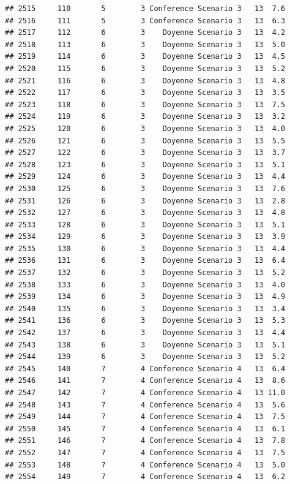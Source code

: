 \documentclass[
]{article}
\begin{document}
\begin{verbatim}
## 2515     110       5        3 Conference Scenario 3   13  7.6
## 2516     111       5        3 Conference Scenario 3   13  6.3
## 2517     112       6        3    Doyenne Scenario 3   13  4.2
## 2518     113       6        3    Doyenne Scenario 3   13  5.0
## 2519     114       6        3    Doyenne Scenario 3   13  4.5
## 2520     115       6        3    Doyenne Scenario 3   13  5.2
## 2521     116       6        3    Doyenne Scenario 3   13  4.8
## 2522     117       6        3    Doyenne Scenario 3   13  3.5
## 2523     118       6        3    Doyenne Scenario 3   13  7.5
## 2524     119       6        3    Doyenne Scenario 3   13  3.2
## 2525     120       6        3    Doyenne Scenario 3   13  4.0
## 2526     121       6        3    Doyenne Scenario 3   13  5.5
## 2527     122       6        3    Doyenne Scenario 3   13  3.7
## 2528     123       6        3    Doyenne Scenario 3   13  5.1
## 2529     124       6        3    Doyenne Scenario 3   13  4.4
## 2530     125       6        3    Doyenne Scenario 3   13  7.6
## 2531     126       6        3    Doyenne Scenario 3   13  2.8
## 2532     127       6        3    Doyenne Scenario 3   13  4.8
## 2533     128       6        3    Doyenne Scenario 3   13  5.1
## 2534     129       6        3    Doyenne Scenario 3   13  3.9
## 2535     130       6        3    Doyenne Scenario 3   13  4.4
## 2536     131       6        3    Doyenne Scenario 3   13  6.4
## 2537     132       6        3    Doyenne Scenario 3   13  5.2
## 2538     133       6        3    Doyenne Scenario 3   13  4.0
## 2539     134       6        3    Doyenne Scenario 3   13  4.9
## 2540     135       6        3    Doyenne Scenario 3   13  3.4
## 2541     136       6        3    Doyenne Scenario 3   13  5.3
## 2542     137       6        3    Doyenne Scenario 3   13  4.4
## 2543     138       6        3    Doyenne Scenario 3   13  5.1
## 2544     139       6        3    Doyenne Scenario 3   13  5.2
## 2545     140       7        4 Conference Scenario 4   13  6.4
## 2546     141       7        4 Conference Scenario 4   13  8.6
## 2547     142       7        4 Conference Scenario 4   13 11.0
## 2548     143       7        4 Conference Scenario 4   13  5.6
## 2549     144       7        4 Conference Scenario 4   13  7.5
## 2550     145       7        4 Conference Scenario 4   13  6.1
## 2551     146       7        4 Conference Scenario 4   13  7.8
## 2552     147       7        4 Conference Scenario 4   13  7.5
## 2553     148       7        4 Conference Scenario 4   13  5.0
## 2554     149       7        4 Conference Scenario 4   13  6.2

\end{verbatim}
\end{document}
